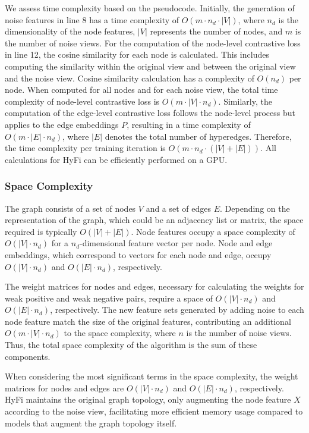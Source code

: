 We assess time complexity based on the pseudocode. Initially, the generation of noise features in line 8 has a time complexity of \( O(m \cdot n_d \cdot |V|) \), where \( n_d \) is the dimensionality of the node features, \( |V| \) represents the number of nodes, and \( m \) is the number of noise views. For the computation of the node-level contrastive loss in line 12, the cosine similarity for each node is calculated. This includes computing the similarity within the original view and between the original view and the noise view. Cosine similarity calculation has a complexity of \( O(n_d) \) per node. When computed for all nodes and for each noise view, the total time complexity of node-level contrastive loss is \( O(m \cdot |V| \cdot n_d) \). Similarly, the computation of the edge-level contrastive loss follows the node-level process but applies to the edge embeddings \( P \), resulting in a time complexity of \( O(m \cdot |E| \cdot n_d) \), where \( |E| \) denotes the total number of hyperedges. Therefore, the time complexity per training iteration is \( O(m \cdot n_d \cdot (|V| + |E|)) \). All calculations for HyFi can be efficiently performed on a GPU.


\subsubsection{Space Complexity}

The graph consists of a set of nodes \( V \) and a set of edges \( E \). Depending on the representation of the graph, which could be an adjacency list or matrix, the space required is typically \( O(|V| + |E|) \). Node features occupy a space complexity of \( O(|V| \cdot n_d) \) for a \( n_d \)-dimensional feature vector per node. Node and edge embeddings, which correspond to vectors for each node and edge, occupy \( O(|V| \cdot n_d) \) and \( O(|E| \cdot n_d) \), respectively. 

The weight matrices for nodes and edges, necessary for calculating the weights for weak positive and weak negative pairs, require a space of \( O(|V| \cdot n_d) \) and \( O(|E| \cdot n_d) \), respectively. The new feature sets generated by adding noise to each node feature match the size of the original features, contributing an additional \( O(m \cdot |V| \cdot n_d) \) to the space complexity, where \( n \) is the number of noise views. Thus, the total space complexity of the algorithm is the sum of these components.

When considering the most significant terms in the space complexity, the weight matrices for nodes and edges are \( O(|V| \cdot n_d) \) and \( O(|E| \cdot n_d) \), respectively. HyFi maintains the original graph topology, only augmenting the node feature \( X \) according to the noise view, facilitating more efficient memory usage compared to models that augment the graph topology itself.
